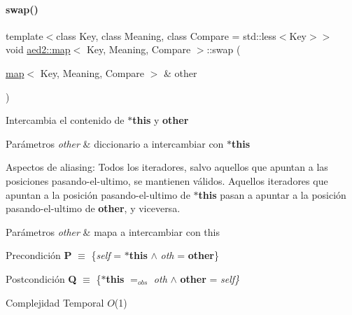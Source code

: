 \paragraph{\texorpdfstring{swap()}{swap()}}
{\footnotesize\ttfamily template$<$class Key, class Meaning, class Compare = std\+::less$<$\+Key$>$$>$ \\
void \hyperlink{classaed2_1_1map}{aed2\+::map}$<$ Key, Meaning, Compare $>$\+::swap (\begin{DoxyParamCaption}\item[{\hyperlink{classaed2_1_1map}{map}$<$ Key, Meaning, Compare $>$ \&}]{other }\end{DoxyParamCaption})\hspace{0.3cm}{\ttfamily [inline]}}



Intercambia el contenido de {\bfseries $\ast$this} y {\bfseries other} 


\begin{DoxyParams}{Parámetros}
{\em other} & diccionario a intercambiar con {\bfseries $\ast$this}\\
\hline
\end{DoxyParams}
\begin{DoxyParagraph}{Aspectos de aliasing\+:}
Todos los iteradores, salvo aquellos que apuntan a las posiciones pasando-\/el-\/ultimo, se mantienen válidos. Aquellos iteradores que apuntan a la posición pasando-\/el-\/ultimo de {\bfseries $\ast$this} pasan a apuntar a la posición pasando-\/el-\/ultimo de {\bfseries other}, y viceversa.
\end{DoxyParagraph}

\begin{DoxyParams}{Parámetros}
{\em other} & mapa a intercambiar con this\\
\hline
\end{DoxyParams}
\begin{DoxyPrecond}{Precondición}
{\bfseries P} $\equiv$ \{{\itshape self} = {\bfseries $\ast$this} $\land$ {\itshape oth} = {\bfseries other}\} 
\end{DoxyPrecond}
\begin{DoxyPostcond}{Postcondición}
{\bfseries Q} $\equiv$ \{{\bfseries $\ast$this} $=_{obs}$ {\itshape oth} $\land$ {\bfseries other} = {\itshape self\}} 
\end{DoxyPostcond}

\begin{DoxyDescription}
\item[Complejidad Temporal]$O$(1)
\end{DoxyDescription}

